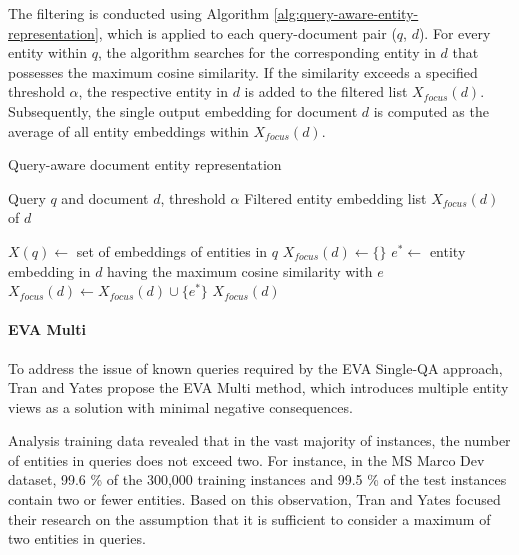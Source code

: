 The filtering is conducted using Algorithm \ref{alg:query-aware-entity-representation}, which is applied to each query-document pair ($q$, $d$). For every entity within $q$, the algorithm searches for the corresponding entity in $d$ that possesses the maximum cosine similarity. If the similarity exceeds a specified threshold $\alpha$, the respective entity in $d$ is added to the filtered list $X_{focus}(d)$. Subsequently, the single output embedding for document $d$ is computed as the average of all entity embeddings within $X_{focus}(d)$.

\begin{algorithm}[!htb]
    \caption{Query-aware document entity representation}
    \label{alg:query-aware-entity-representation}
    \begin{algorithmic}[1]
    \REQUIRE Query $q$ and document $d$, threshold $\alpha$
    \ENSURE Filtered entity embedding list $X_{focus}(d)$ of $d$
    
    \STATE $X(q) \leftarrow$ set of embeddings of entities in $q$
    \STATE $X_{focus}(d) \leftarrow \{\}$
        \STATE $e^* \leftarrow$ entity embedding in $d$ having the maximum cosine similarity with $e$
            \STATE $X_{focus}(d) \leftarrow X_{focus}(d) \cup \{e^*\}$
        \ENDIF
    \ENDFOR
    \RETURN $X_{focus}(d)$
    \end{algorithmic}
\end{algorithm}

\paragraph*{EVA Multi}

To address the issue of known queries required by the EVA Single-QA approach, Tran and Yates propose the EVA Multi method, which introduces multiple entity views as a solution with minimal negative consequences.

Analysis training data revealed that in the vast majority of instances, the number of entities in queries does not exceed two. For instance, in the MS Marco Dev dataset, 99.6 \% of the 300,000 training instances and 99.5 \% of the test instances contain two or fewer entities. Based on this observation, Tran and Yates focused their research on the assumption that it is sufficient to consider a maximum of two entities in queries.

